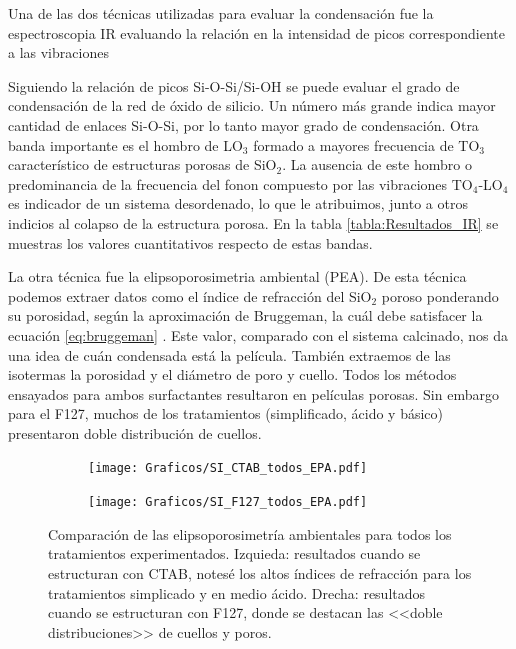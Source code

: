 {	 	Una de las dos técnicas utilizadas para evaluar la condensación fue la espectroscopia IR evaluando la relación en la intensidad de picos correspondiente a las vibraciones 	

		
			Siguiendo la relación de picos Si-O-Si/Si-OH se puede evaluar el grado de condensación de la red de óxido de silicio. Un número más grande indica mayor cantidad de enlaces Si-O-Si, por lo tanto mayor grado de condensación. Otra banda importante es el hombro de LO$_3$ formado a mayores frecuencia de TO$_3$ característico de estructuras porosas de SiO$_2$. La ausencia de este hombro o predominancia de la frecuencia del fonon compuesto por las vibraciones TO$_4$-LO$_4$ es indicador de un sistema desordenado\cite{Innocenzi2003,Lange1990,Lange1989}, lo que le atribuimos, junto a otros indicios al colapso de la estructura porosa. En la tabla \ref{tabla:Resultados_IR} se muestras los valores cuantitativos respecto de estas bandas.

			La otra técnica fue la elipsoporosimetria ambiental (PEA). De esta técnica podemos extraer datos como el índice de refracción del SiO$_2$ poroso ponderando su porosidad, según la aproximación de Bruggeman, la cuál debe satisfacer la ecuación \ref{eq:bruggeman} \cite{Bruggeman1935}. Este valor, comparado con el sistema calcinado, nos da una idea de cuán condensada está la película. También extraemos de las isotermas la porosidad y el diámetro de poro y cuello. Todos los métodos ensayados para ambos surfactantes resultaron en películas porosas. Sin embargo para el F127, muchos de los tratamientos (simplificado, ácido y básico) presentaron doble distribución de cuellos. 

			\begin{figure}[!th]
		 	   	    \begin{subfigure}[t]{0.49\textwidth}
			       	\texttt{[image: Graficos/SI\_CTAB\_todos\_EPA.pdf]}
			   		\end{subfigure}
			   		\begin{subfigure}[t]{0.49\textwidth}
			   	    \texttt{[image: Graficos/SI\_F127\_todos\_EPA.pdf]}
			   		\end{subfigure}
					 \caption[Comparación PEA tratamientos alternativos]{Comparación de las elipsoporosimetría ambientales para todos los tratamientos experimentados. Izquieda: resultados cuando se estructuran con CTAB, notesé los altos índices de refracción para los tratamientos simplicado y en medio ácido. Drecha: resultados cuando se estructuran con F127, donde se destacan las <<doble distribuciones>> de cuellos y poros.}
					 \label{fig:todos_EPA}	
				     \end{figure}


}

